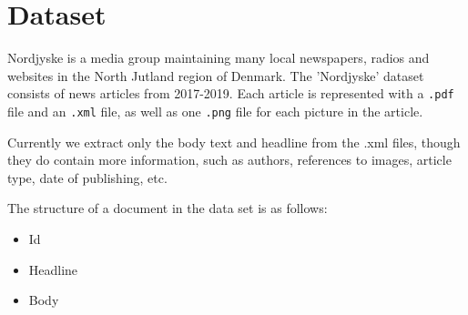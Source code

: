 \section{Dataset}
Nordjyske is a media group maintaining many local newspapers, radios and websites in the North Jutland region of Denmark.
The 'Nordjyske' dataset consists of news articles from 2017-2019. 
Each article is represented with a \texttt{.pdf} file and an \texttt{.xml} file, as well as one \texttt{.png} file for each picture in the article.

Currently we extract only the body text and headline from the .xml files, though they do contain more information, such as authors, references to images, article type, date of publishing, etc.

The structure of a document in the data set is as follows:
\begin{itemize}
	\item Id
	\item Headline
	\item Body
\end{itemize}
